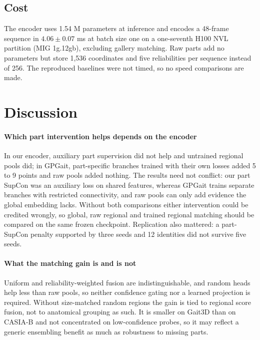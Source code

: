 \documentclass[journal]{IEEEtran}
\begin{document}
\subsection{Cost}

The encoder uses 1.54 M parameters at inference and encodes a 48-frame sequence
in $4.06\pm0.07$ ms at batch size one on a one-seventh H100 NVL partition (MIG
1g.12gb), excluding gallery matching. Raw parts add no parameters but store
1,536 coordinates and five reliabilities per sequence instead of 256. The
reproduced baselines were not timed, so no speed comparisons are made.

\section{Discussion}
\label{sec:discussion}

\paragraph{Which part intervention helps depends on the encoder}
In our encoder, auxiliary part supervision did not help and untrained regional
pools did; in GPGait, part-specific branches trained with their own losses
added 5 to 9 points and raw pools added nothing. The results need not conflict:
our part SupCon was an auxiliary loss on shared features, whereas GPGait trains
separate branches with restricted connectivity, and raw pools can only add
evidence the global embedding lacks. Without both comparisons either intervention
could be credited wrongly, so global, raw regional and trained regional matching
should be compared on the same frozen checkpoint. Replication also mattered: a
part-SupCon penalty supported by three seeds and 12 identities did not survive
five seeds.

\paragraph{What the matching gain is and is not}
Uniform and reliability-weighted fusion are indistinguishable, and random
heads help less than raw pools, so neither confidence gating nor a learned
projection is required. Without size-matched random regions the gain is tied to
regional score fusion, not to anatomical grouping as such. It is smaller on
Gait3D than on CASIA-B and not concentrated on low-confidence probes, so it may
reflect a generic ensembling benefit as much as robustness to missing parts.
\end{document}
